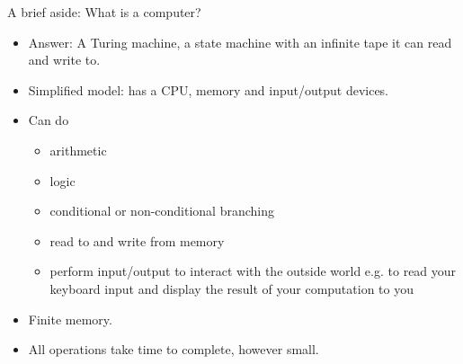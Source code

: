\documentclass{beamer}
\begin{document}



\begin{frame}{A brief aside: What is a computer?}
\begin{itemize}
\item Answer: A Turing machine, a state machine with an infinite tape it can read and write to.
\item Simplified model: has a CPU, memory and input/output devices.
\item Can do
\begin{itemize}
\item arithmetic
\item logic
\item conditional or non-conditional branching
\item read to and write from memory
\item perform input/output to interact with the outside world e.g. to read your keyboard input and display 
			the result of your computation to you
\end{itemize}
\item Finite memory.
\item All operations take time to complete, however small.
\end{itemize}
\end{frame}
\end{document}
